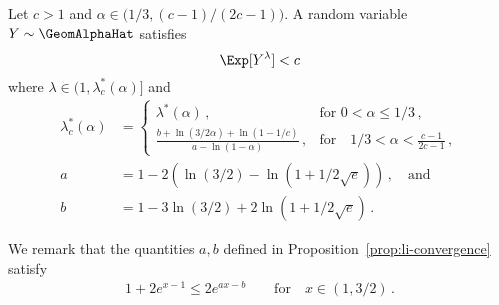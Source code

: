 \begin{proposition}\label{prop:li-convergence-absolute}
Let $c > 1$ and $\alpha \in \big(1/3, (c-1)/(2c-1) \big)$. 
A random variable $Y \sim \GeomAlphaHat$ satisfies
\begin{equation}\label{eq:li-convergence-absolute}
    \Exp[Y^\lambda] 
    < c
\end{equation}
where $\lambda \in \big(1, \lambda^*_c(\alpha)\big]$ 
and 
\begin{align}\label{eq:lambda-star-c}
    \lambda^*_c(\alpha) &= \begin{cases}
    \lambda^*(\alpha)\,, &\text{for } 0 < \alpha \leq 1/3\,,\\
    \frac{b + \ln(3/2\alpha) + \ln(1-1/c)}{a-\ln(1-\alpha)}
        \,, &\text{for}\quad 1/3 < \alpha < \frac{c-1}{2c-1}\,,
    \end{cases}\\
        a&= 1 - 2\left( \ln(3/2)-\ln(1+1/2\sqrt{e}) \right)\,,\quad\text{and} \nonumber \\
        b&=1-3\ln(3/2)+2\ln(1+1/2\sqrt{e}) \nonumber \,.
\end{align}
\end{proposition}
We remark that the quantities $a,b$ defined in Proposition~\ref{prop:li-convergence} satisfy
\begin{align}\label{eq:lambda-a-b-upperbound}
    1 + 2e^{x-1} \leq 2 e^{a x - b}
    \qquad\text{for}\quad x \in (1, 3/2)
    \, .
\end{align}
